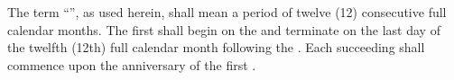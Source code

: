 \label{sec:lease-year}
The term ``'', as used herein, shall mean a period of twelve (12) consecutive full calendar months. The first \leaseYear shall begin on the \rentCommencementDate and terminate on the last day of the twelfth (12th) full calendar month following the \rentCommencementDate. Each succeeding \leaseYear shall commence upon the anniversary of the first \leaseYear.
